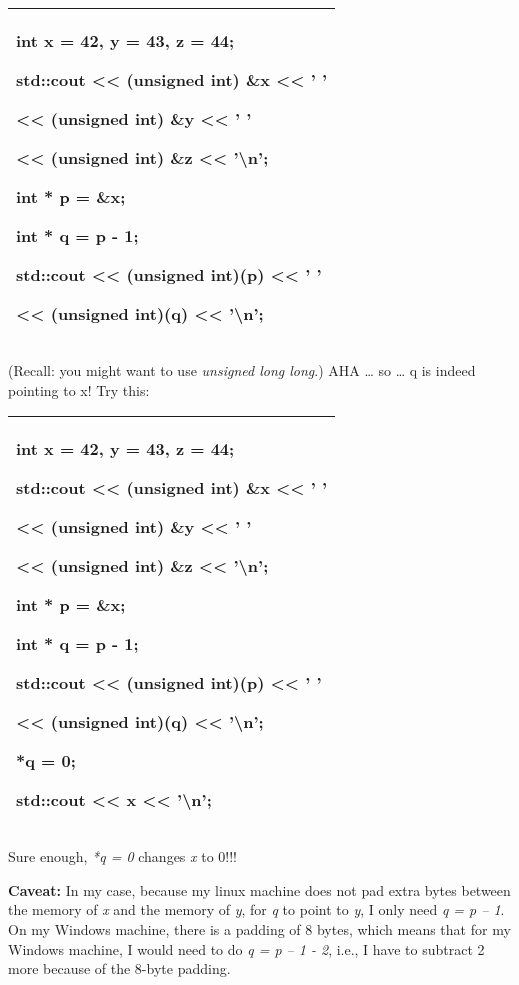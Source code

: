 \documentclass[
]{article}
\begin{document}
\begin{longtable}[]{@{}l@{}}
\toprule
\endhead
\begin{minipage}[t]{0.97\columnwidth}\raggedright
int x = 42, y = 43, z = 44;

std::cout \textless\textless{} (unsigned int) \&x \textless\textless{} '
'

\textless\textless{} (unsigned int) \&y \textless\textless{} ' '

\textless\textless{} (unsigned int) \&z \textless\textless{}
'\textbackslash n';

int * p = \&x;

int * q = p - 1;

std::cout \textless\textless{} (unsigned int)(p) \textless\textless{} '
'

\textless\textless{} (unsigned int)(q) \textless\textless{}
'\textbackslash n'; \strut
\end{minipage}\tabularnewline
\bottomrule
\end{longtable}

(Recall: you might want to use \emph{unsigned long long}.) AHA \ldots{}
so \ldots{} q is indeed pointing to x! Try this:

\begin{longtable}[]{@{}l@{}}
\toprule
\endhead
\begin{minipage}[t]{0.97\columnwidth}\raggedright
int x = 42, y = 43, z = 44;

std::cout \textless\textless{} (unsigned int) \&x \textless\textless{} '
'

\textless\textless{} (unsigned int) \&y \textless\textless{} ' '

\textless\textless{} (unsigned int) \&z \textless\textless{}
'\textbackslash n';

int * p = \&x;

int * q = p - 1;

std::cout \textless\textless{} (unsigned int)(p) \textless\textless{} '
'

\textless\textless{} (unsigned int)(q) \textless\textless{}
'\textbackslash n';

*q = 0;

std::cout \textless\textless{} x \textless\textless{}
'\textbackslash n';\strut
\end{minipage}\tabularnewline
\bottomrule
\end{longtable}

Sure enough, \emph{*q = 0} changes \emph{x} to 0!!!

\textbf{Caveat:} In my case, because my linux machine does not pad extra
bytes between the memory of \emph{x} and the memory of \emph{y}, for
\emph{q} to point to \emph{y}, I only need \emph{q = p -- 1}. On my
Windows machine, there is a padding of 8 bytes, which means that for my
Windows machine, I would need to do \emph{q = p -- 1 - 2}, i.e., I have
to subtract 2 more because of the 8-byte padding.
\end{document}
